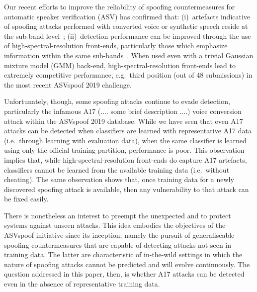 Our recent efforts to improve the reliability of spoofing countermeasures for automatic speaker verification (ASV) has confirmed that: (i)~artefacts indicative of spoofing attacks performed with converted voice or synthetic speech reside at the sub-band level~\cite{odyssey2020CQCC}; (ii)~detection performance can be improved through the use of high-spectral-resolution front-ends, particularly those which emphasize information within the same sub-bands~\cite{IS2020LFCC}.  When used even with a trivial Gaussian mixture model (GMM) back-end, high-spectral-resolution front-ends lead to extremely competitive performance, e.g.\ third position (out of 48 submissions) in the most recent ASVspoof 2019 challenge. 

Unfortunately, though, some spoofing attacks continue to evade detection, particularly the infamous A17 (.... some brief description ....) voice conversion attack within the ASVspoof 2019 database.  While we have seen that even A17 attacks can be detected when classifiers are learned with representative A17 data (i.e.\ through learning with evaluation data), when the same classifier is learned using only the official training partition, performance is poor.  This observation implies that, while high-spectral-resolution front-ends do capture A17 artefacts, classifiers cannot be learned from the available training data (i.e.\ without cheating).  The same observation shows that, once training data for a newly discovered spoofing attack is available, then any vulnerability to that attack can be fixed easily.  

There is nonetheless an interest to preempt the unexpected and to protect systems against unseen attacks.  This idea embodies the objectives of the ASVspoof initiative since its inception, namely the pursuit of generaliseable spoofing countermeasures that are capable of detecting attacks not seen in training data. The latter are characteristic of in-the-wild settings in which the nature of spoofing attacks cannot be predicted and will evolve continuously.  The question addressed in this paper, then, is whether A17 attacks can be detected even in the absence of representative training data.

